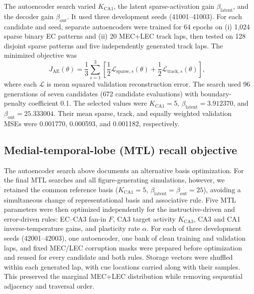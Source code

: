 The autoencoder search varied $K_{\mathrm{CA1}}$, the latent sparse-activation
gain $\beta_{\mathrm{latent}}$, and the decoder gain
$\beta_{\mathrm{out}}$. It used three development seeds (41001--41003). For
each candidate and seed, separate autoencoders were trained for 64 epochs on
(i) 1,024 sparse binary EC patterns and (ii) 20 MEC+LEC track laps, then tested
on 128 disjoint sparse patterns and five independently generated track laps.
The minimized objective was
\begin{equation}
J_{\mathrm{AE}}(\theta)=\frac{1}{3}\sum_{s=1}^{3}
\left[\frac{1}{2}\mathcal{L}_{\mathrm{sparse},s}(\theta)
+\frac{1}{2}\mathcal{L}_{\mathrm{track},s}(\theta)\right],
\label{eq:ae-evolution-fitness}
\end{equation}
where each $\mathcal{L}$ is mean squared validation reconstruction error. The
search used 96 generations of seven candidates (672 candidate evaluations)
with boundary-penalty coefficient 0.1. The selected values were
$K_{\mathrm{CA1}}=5$, $\beta_{\mathrm{latent}}=3.912370$, and
$\beta_{\mathrm{out}}=25.333004$. Their mean sparse, track, and equally weighted
validation MSEs were 0.001770, 0.000593, and 0.001182, respectively.

\subsection*{Medial-temporal-lobe (MTL) recall objective}

The autoencoder search above documents an alternative basis optimization. For
the final MTL searches and all figure-generating simulations, however, we
retained the common reference basis ($K_{\mathrm{CA1}}=5$,
$\beta_{\mathrm{latent}}=\beta_{\mathrm{out}}=25$), avoiding a simultaneous
change of representational basis and associative rule. Five
MTL parameters were then optimized independently for the instructive-driven
and error-driven rules: EC--CA3 fan-in $F$, CA3 target activity
$K_{\mathrm{CA3}}$, CA3 and CA1 inverse-temperature gains, and plasticity rate
$\alpha$. For each of three development seeds (42001--42003), one autoencoder,
one bank of clean training and validation laps, and fixed MEC/LEC corruption
masks were prepared before optimization and reused for every candidate and
both rules. Storage vectors were shuffled within each generated lap, with cue
locations carried along with their samples. This preserved the marginal
MEC+LEC distribution while removing sequential adjacency and traversal order.

